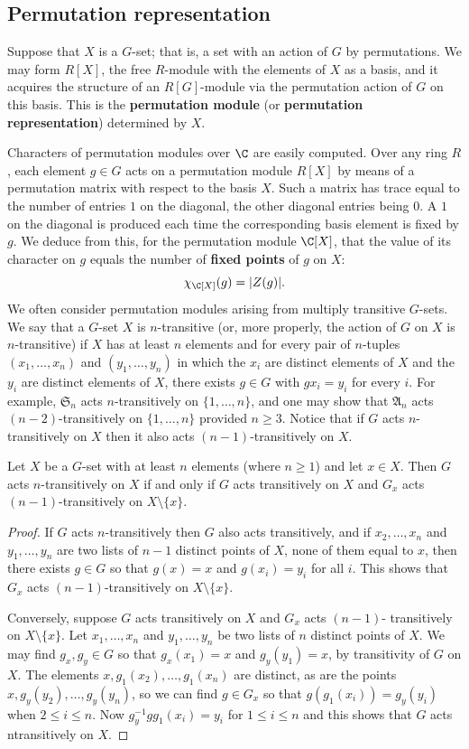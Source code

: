 \subsection{Permutation representation}
Suppose that $X$ is a $G$-set; that is, a set with an action of $G$ by permutations. We may form $R[X]$, the free $R$-module with the elements of $X$ as a basis, and it acquires the structure of an $R[G]$-module via the permutation action of $G$ on this basis. This is the \textbf{permutation module} (or \textbf{permutation representation}) determined by $X$.\par
Characters of permutation modules over $\C$ are easily computed. Over any ring $R$, each element $g\in G$ acts on a permutation module $R[X]$ by means of a permutation matrix with respect to the basis $X$. Such a matrix has trace equal to the number of entries $1$ on the diagonal, the other diagonal entries being $0$. A $1$ on the diagonal is produced each time the corresponding basis element is fixed by $g$. We deduce from this, for the permutation module $\C[X]$, that the value of its character on $g$ equals the number of \textbf{fixed points} of $g$ on $X$:
\[\chi_{\C[X]}(g)=|Z(g)|.\]
We often consider permutation modules arising from multiply transitive $G$-sets. We say that a $G$-set $X$ is $n$-transitive (or, more properly, the action of $G$ on $X$ is $n$-transitive) if $X$ has at least $n$ elements and for every pair of $n$-tuples $(x_1,\dots,x_n)$ and $(y_1,\dots,y_n)$ in which the $x_i$ are distinct elements of $X$ and the $y_i$ are distinct elements of $X$, there exists $g\in G$ with $gx_i=y_i$ for every $i$. For example, $\mathfrak{S}_n$ acts $n$-transitively on $\{1,\dots,n\}$, and one may show that $\mathfrak{A}_n$ acts $(n-2)$-transitively on $\{1,\dots,n\}$ provided $n\geq 3$. Notice that if $G$ acts $n$-transitively on $X$ then it also acts $(n-1)$-transitively on $X$.
\begin{lemma}
Let $X$ be a $G$-set with at least $n$ elements (where $n\geq 1$) and let $x\in X$. Then $G$ acts $n$-transitively on $X$ if and only if $G$ acts transitively on $X$ and $G_x$ acts $(n-1)$-transitively on $X\setminus\{x\}$.
\end{lemma}
\begin{proof}
If $G$ acts $n$-transitively then $G$ also acts transitively, and if $x_2,\dots,x_n$ and $y_1,\dots,y_n$ are two lists of $n-1$ distinct points of $X$, none of them equal to $x$, then there exists $g\in G$ so that $g(x)=x$ and $g(x_i)=y_i$ for all $i$. This shows that $G_x$ acts $(n-1)$-transitively on $X\setminus\{x\}$.\par
Conversely, suppose $G$ acts transitively on $X$ and $G_x$ acts $(n-1)$- transitively on $X\setminus\{x\}$. Let $x_1,\dots,x_n$ and $y_1,\dots,y_n$ be two lists of $n$ distinct points of $X$. We may find $g_x,g_y\in G$ so that $g_x(x_1)=x$ and $g_y(y_1)=x$, by transitivity of $G$ on $X$. The elements $x,g_1(x_2),\dots,g_1(x_n)$ are distinct, as are the points $x,g_y(y_2),\dots,g_y(y_n)$, so we can find $g\in G_x$ so that $g(g_1(x_i))=g_y(y_i)$ when $2\leq i\leq n$. Now $g_y^{-1}gg_1(x_i)=y_i$ for $1\leq i\leq n$ and this shows that $G$ acts ntransitively on $X$.
\end{proof}
